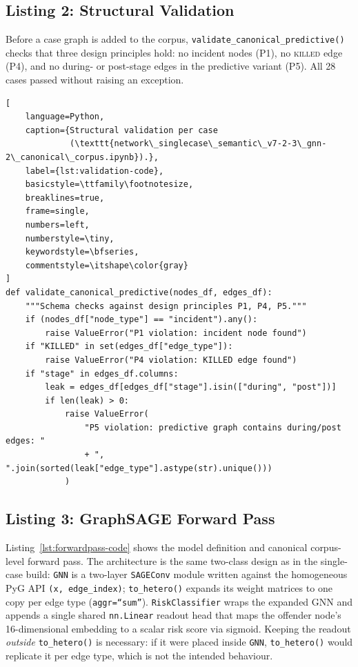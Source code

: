 \subsection*{Listing 2: Structural Validation}
Before a case graph is added to the corpus, \texttt{validate\_canonical\_predictive()}
checks that three design principles hold: no incident nodes (P1), no
\textsc{killed} edge (P4), and no during- or post-stage edges in the
predictive variant (P5). All 28 cases passed without raising an exception.

\begin{lstlisting}[
    language=Python,
    caption={Structural validation per case
             (\texttt{network\_singlecase\_semantic\_v7-2-3\_gnn-2\_canonical\_corpus.ipynb}).},
    label={lst:validation-code},
    basicstyle=\ttfamily\footnotesize,
    breaklines=true,
    frame=single,
    numbers=left,
    numberstyle=\tiny,
    keywordstyle=\bfseries,
    commentstyle=\itshape\color{gray}
]
def validate_canonical_predictive(nodes_df, edges_df):
    """Schema checks against design principles P1, P4, P5."""
    if (nodes_df["node_type"] == "incident").any():
        raise ValueError("P1 violation: incident node found")
    if "KILLED" in set(edges_df["edge_type"]):
        raise ValueError("P4 violation: KILLED edge found")
    if "stage" in edges_df.columns:
        leak = edges_df[edges_df["stage"].isin(["during", "post"])]
        if len(leak) > 0:
            raise ValueError(
                "P5 violation: predictive graph contains during/post edges: "
                + ", ".join(sorted(leak["edge_type"].astype(str).unique()))
            )
\end{lstlisting}

\subsection*{Listing 3: GraphSAGE Forward Pass}
Listing~\ref{lst:forwardpass-code} shows the model definition and canonical
corpus-level forward pass. The architecture is the same two-class design
as in the single-case build: \texttt{GNN} is a two-layer
\texttt{SAGEConv} module written against the homogeneous PyG API
\texttt{(x,~edge\_index)}; \texttt{to\_hetero()} expands its weight matrices
to one copy per edge type (\texttt{aggr=``sum''}). \texttt{RiskClassifier}
wraps the expanded GNN and appends a single shared \texttt{nn.Linear} readout
head that maps the offender node's 16-dimensional embedding to a scalar risk
score via sigmoid. Keeping the readout \emph{outside} \texttt{to\_hetero()}
is necessary: if it were placed inside \texttt{GNN}, \texttt{to\_hetero()}
would replicate it per edge type, which is not the intended behaviour.


